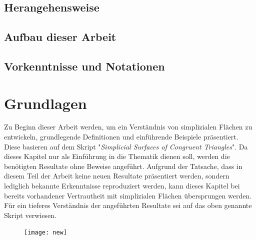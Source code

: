 \documentclass[12pt,titlepage,twoside,cleardoublepage]{article}
\theoremstyle{nummermitklammern}
\numberwithin{equation}{section}
\begin{document}
\subsection{Herangehensweise}
\subsection{Aufbau dieser Arbeit}
\subsection{Vorkenntnisse und Notationen}
\section{Grundlagen} \label{Grundlagen}
Zu Beginn dieser Arbeit werden, um ein Verständnis von simplizialen Flächen zu entwickeln, grundlegende Definitionen und einführende Beispiele präsentiert. Diese basieren auf dem Skript "\emph{Simplicial Surfaces of Congruent Triangles}". Da dieses Kapitel nur als Einführung in die Thematik dienen soll, werden die benötigten Resultate ohne Beweise angeführt. Aufgrund der Tatsache, dass in diesem Teil der Arbeit keine neuen Resultate präsentiert werden, sondern lediglich bekannte Erkenntnisse reproduziert werden, kann dieses Kapitel bei bereits vorhandener Vertrautheit mit simplizialen Flächen übersprungen werden. Für ein tieferes Verständnis der angeführten Resultate sei auf das oben genannte Skript verwiesen.
\begin{figure}[H]
\begin{center}
\texttt{[image: new]}
\end{center}
\end{figure}
\end{document}
